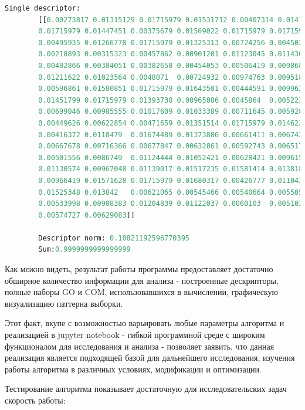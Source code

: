 {{{{{   		\begin{lstlisting}[frame=single,language=Python,mathescape=true] 
   		Single descriptor:
   		[[0.00273817 0.01315129 0.01715979 0.01531712 0.00407314 0.01419661
   		0.01715979 0.01447451 0.00375679 0.01569022 0.01715979 0.01715979
   		0.00495935 0.01266778 0.01715979 0.01325313 0.00724256 0.00450238
   		0.00218893 0.00315323 0.00457862 0.00901201 0.01123045 0.01143024
   		0.00482866 0.00384051 0.00382658 0.00454053 0.00506419 0.00986872
   		0.01211622 0.01023564 0.0048071  0.00724932 0.00974763 0.00951843
   		0.00596861 0.01580851 0.01715979 0.01643501 0.00444591 0.00996207
   		0.01451799 0.01715979 0.01393738 0.00965086 0.0045864  0.00522394
   		0.00699046 0.00985555 0.01017609 0.01033389 0.00711645 0.00592839
   		0.00449626 0.00622854 0.00471659 0.01351514 0.01715979 0.01462342
   		0.00416372 0.0118479  0.01674489 0.01373806 0.00661411 0.00674226
   		0.00667678 0.00716366 0.00677847 0.00632861 0.00592743 0.00651756
   		0.00501556 0.0086749  0.01124444 0.01052421 0.00628421 0.00961532
   		0.01130574 0.00967048 0.01139017 0.01517235 0.01581414 0.01381832
   		0.00966419 0.01571628 0.01715979 0.01680317 0.00426777 0.01104361
   		0.01525348 0.013842   0.00621065 0.00545466 0.00540664 0.00550541
   		0.00533998 0.00908383 0.01204839 0.01122037 0.0060103  0.00510225
   		0.00574727 0.00629083]]
   		
   		Descriptor norm: 0.10821192596770395
   		Sum:0.9999999999999999
   		\end{lstlisting}
   		
   		Как можно видеть, результат работы программы предоставляет достаточно обширное количество информации для анализа - построенные дескрипторы, полные наборы GO и COM, использовавшихся в вычислении, графическую визуализацию паттерна выборки. 
   		
   		Этот факт, вкупе с возможностью варьировать любые параметры алгоритма и реализацией в jupyter notebook - гибкой программной среде с широким функционалом для исследования и анализа - позволяет заявить, что данная реализация является подходящей базой для дальнейшего исследования, изучения работы алгоритма в различных условиях, модификации и оптимизации. 
   		
   		Тестирование алгоритма показывает достаточную для исследовательских задач скорость работы: 
   		
}}}}}
